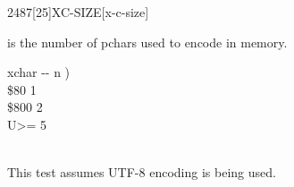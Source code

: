 \vspace*{-2ex}
\begin{worddef}{2487}[25]{XC-SIZE}[x-c-size]%
\item {}

	 is the number of pchars used to encode  in memory.

	\begin{implement} %
	\word{:}   xchar -{}- n ) \\
	\tab {} \$80    1     \\
	\tab \$800  2  \\
	\tab {}  U>=   5         \\
	\tab {}  \\
	\word{;}
	\end{implement}

	\begin{testing} %
		This test assumes UTF-8 encoding is being used.

		\ttfamily
		 \\
		 \\
		 \\
		 \\
		 \\
		 \\
		 \\
		 \\
  \end{testing}
\end{worddef}

